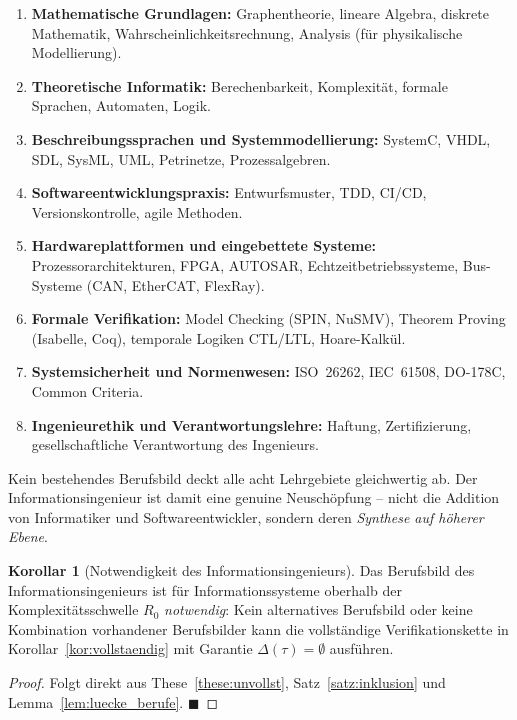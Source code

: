 ﻿\documentclass[a4paper,12pt]{report}
\theoremstyle{definition}
\newtheorem{korollar}{Korollar}[section]
\begin{document}
\begin{enumerate}
  \item \textbf{Mathematische Grundlagen:}
        Graphentheorie, lineare Algebra, diskrete Mathematik, Wahrscheinlichkeitsrechnung,
        Analysis (für physikalische Modellierung).
  \item \textbf{Theoretische Informatik:}
        Berechenbarkeit, Komplexität, formale Sprachen, Automaten, Logik.
  \item \textbf{Beschreibungssprachen und Systemmodellierung:}
        SystemC, VHDL, SDL, SysML, UML, Petrinetze, Prozessalgebren.
  \item \textbf{Softwareentwicklungspraxis:}
        Entwurfsmuster, TDD, CI/CD, Versionskontrolle, agile Methoden.
  \item \textbf{Hardwareplattformen und eingebettete Systeme:}
        Prozessorarchitekturen, FPGA, AUTOSAR, Echtzeitbetriebssysteme,
        Bus-Systeme (CAN, EtherCAT, FlexRay).
  \item \textbf{Formale Verifikation:}
        Model Checking (SPIN, NuSMV), Theorem Proving (Isabelle, Coq),
        temporale Logiken CTL/LTL, Hoare-Kalkül.
  \item \textbf{Systemsicherheit und Normenwesen:}
        ISO~26262, IEC~61508, DO-178C, Common Criteria.
  \item \textbf{Ingenieurethik und Verantwortungslehre:}
        Haftung, Zertifizierung, gesellschaftliche Verantwortung des Ingenieurs.
\end{enumerate}

Kein bestehendes Berufsbild deckt alle acht Lehrgebiete gleichwertig ab.
Der Informationsingenieur ist damit eine genuine Neuschöpfung -- nicht die Addition
von Informatiker und Softwareentwickler, sondern deren \emph{Synthese auf
höherer Ebene}.

\begin{korollar}[Notwendigkeit des Informationsingenieurs]
\label{kor:notwendigkeit}
Das Berufsbild des Informationsingenieurs ist für Informationssysteme oberhalb der
Komplexitätsschwelle $R_0$ \emph{notwendig}: Kein alternatives Berufsbild oder keine
Kombination vorhandener Berufsbilder kann die vollständige Verifikationskette in
Korollar~\ref{kor:vollstaendig} mit Garantie $\Delta(\tau) = \emptyset$ ausführen.
\end{korollar}

\begin{proof}
Folgt direkt aus These~\ref{these:unvollst}, Satz~\ref{satz:inklusion}
und Lemma~\ref{lem:luecke_berufe}. $\blacksquare$
\end{proof}
\end{document}
